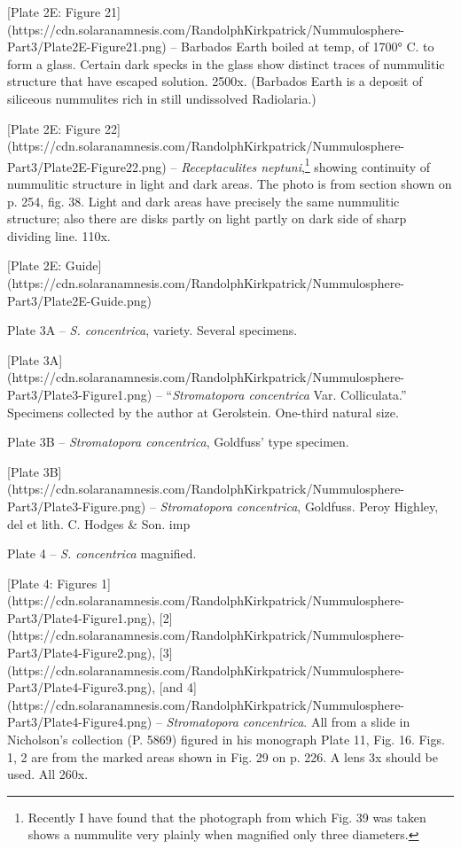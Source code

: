 \documentclass[a4paper, 12pt, oneside]{article}
\begin{document}
[Plate 2E: Figure 21](https://cdn.solaranamnesis.com/RandolphKirkpatrick/Nummulosphere-Part3/Plate2E-Figure21.png) -- Barbados Earth boiled at temp, of 1700° C. to form a glass. Certain dark specks in the glass show distinct traces of nummulitic structure that have escaped solution. 2500x. (Barbados Earth is a deposit of siliceous nummulites rich in still undissolved Radiolaria.)

[Plate 2E: Figure 22](https://cdn.solaranamnesis.com/RandolphKirkpatrick/Nummulosphere-Part3/Plate2E-Figure22.png) -- \emph{Receptaculites neptuni},\footnote{Recently I have found that the photograph from which Fig. 39 was taken shows a nummulite very plainly when magnified only three diameters.} showing continuity of nummulitic structure in light and dark areas. The photo is from section shown on p. 254, fig. 38. Light and dark areas have precisely the same nummulitic structure; also there are disks partly on light partly on dark side of sharp dividing line. 110x.

[Plate 2E: Guide](https://cdn.solaranamnesis.com/RandolphKirkpatrick/Nummulosphere-Part3/Plate2E-Guide.png)

Plate 3A -- \emph{S. concentrica}, variety. Several specimens.

[Plate 3A](https://cdn.solaranamnesis.com/RandolphKirkpatrick/Nummulosphere-Part3/Plate3-Figure1.png) -- ``\emph{Stromatopora concentrica} Var. Colliculata.'' Specimens collected by the author at Gerolstein. One-third natural size.

Plate 3B -- \emph{Stromatopora concentrica}, Goldfuss' type specimen.

[Plate 3B](https://cdn.solaranamnesis.com/RandolphKirkpatrick/Nummulosphere-Part3/Plate3-Figure.png) -- \emph{Stromatopora concentrica}, Goldfuss. Peroy Highley, del et lith. C. Hodges \& Son. imp

Plate 4 -- \emph{S. concentrica} magnified.

[Plate 4: Figures 1](https://cdn.solaranamnesis.com/RandolphKirkpatrick/Nummulosphere-Part3/Plate4-Figure1.png), [2](https://cdn.solaranamnesis.com/RandolphKirkpatrick/Nummulosphere-Part3/Plate4-Figure2.png), [3](https://cdn.solaranamnesis.com/RandolphKirkpatrick/Nummulosphere-Part3/Plate4-Figure3.png), [and 4](https://cdn.solaranamnesis.com/RandolphKirkpatrick/Nummulosphere-Part3/Plate4-Figure4.png) -- \emph{Stromatopora concentrica}. All from a slide in Nicholson's collection (P. 5869) figured in his monograph Plate 11, Fig. 16. Figs. 1, 2 are from the marked areas shown in Fig. 29 on p. 226. A lens 3x should be used. All 260x.
\end{document}
